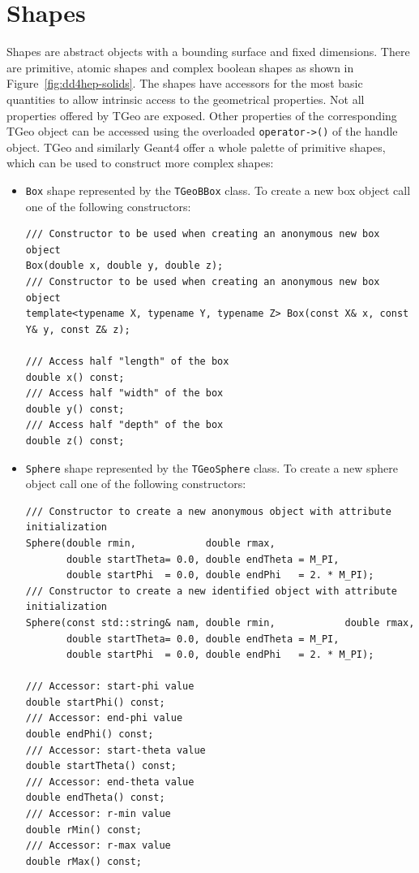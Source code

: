 \section{Shapes}
\label{dd4hep-basic-shapes}

Shapes are abstract objects with a bounding surface and fixed dimensions.  There are primitive, atomic shapes and complex boolean shapes as shown in Figure~\ref{fig:dd4hep-solids}. The shapes have accessors for the most basic quantities to allow intrinsic access to the geometrical properties. Not all properties offered by TGeo are exposed. Other properties of the corresponding TGeo object can be accessed using the overloaded \texttt{operator->()} of the handle object. TGeo and similarly Geant4 offer a whole palette of primitive shapes, which can be used to construct more complex shapes:
\begin{itemize}
\item \texttt{Box} shape represented by the \texttt{TGeoBBox} class. To create a new box object call one of the following constructors:
\begin{verbatim}
/// Constructor to be used when creating an anonymous new box object
Box(double x, double y, double z);
/// Constructor to be used when creating an anonymous new box object
template<typename X, typename Y, typename Z> Box(const X& x, const Y& y, const Z& z);

/// Access half "length" of the box
double x() const;
/// Access half "width" of the box
double y() const;
/// Access half "depth" of the box
double z() const;
\end{verbatim}
\item \texttt{Sphere} shape represented by the \texttt{TGeoSphere} class. To create a new sphere object call one of the following constructors:
\begin{verbatim}
/// Constructor to create a new anonymous object with attribute initialization
Sphere(double rmin,            double rmax,
       double startTheta= 0.0, double endTheta = M_PI,
       double startPhi  = 0.0, double endPhi   = 2. * M_PI);
/// Constructor to create a new identified object with attribute initialization
Sphere(const std::string& nam, double rmin,            double rmax,
       double startTheta= 0.0, double endTheta = M_PI,
       double startPhi  = 0.0, double endPhi   = 2. * M_PI);

/// Accessor: start-phi value
double startPhi() const;
/// Accessor: end-phi value 
double endPhi() const;
/// Accessor: start-theta value
double startTheta() const;
/// Accessor: end-theta value
double endTheta() const;
/// Accessor: r-min value
double rMin() const;
/// Accessor: r-max value
double rMax() const;
\end{verbatim}


\end{itemize}
